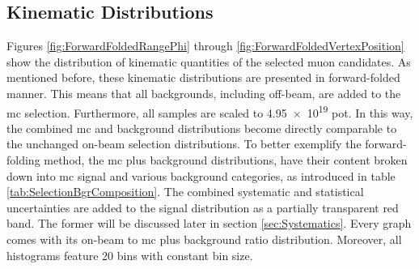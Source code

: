 \subsection{Kinematic Distributions} \label{sec:KinematicDistributions}
Figures \ref{fig:ForwardFoldedRangePhi} through \ref{fig:ForwardFoldedVertexPosition} show the distribution of kinematic quantities of the selected muon candidates. As mentioned before, these kinematic distributions are presented in forward-folded manner. This means that all backgrounds, including off-beam, are added to the \gls{mc} selection. Furthermore, all samples are scaled to \num{4.95e19} \gls{pot}. In this way, the combined \gls{mc} and background distributions become directly comparable to the unchanged on-beam selection distributions. To better exemplify the forward-folding method, the \gls{mc} plus background distributions, have their content broken down into \gls{mc} signal and various background categories, as introduced in table \ref{tab:SelectionBgrComposition}. The combined systematic and statistical uncertainties are added to the signal distribution as a partially transparent red band. The former will be discussed later in section \ref{sec:Systematics}. Every graph comes with its on-beam to \gls{mc} plus background ratio distribution. Moreover, all histograms feature \num{20} bins with constant bin size.

